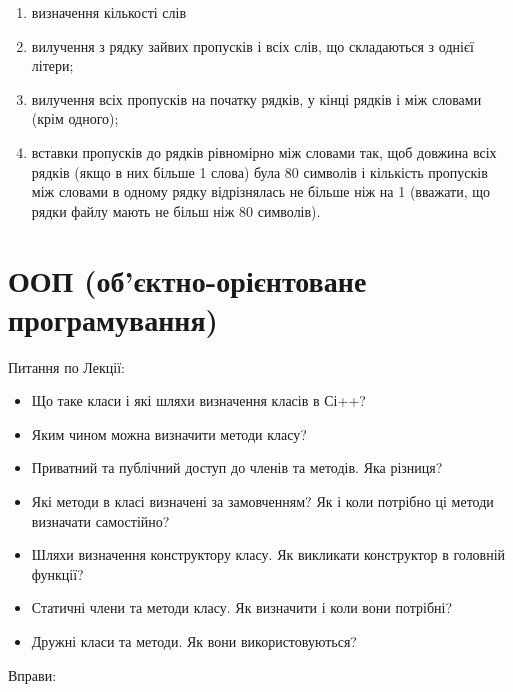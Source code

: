\documentclass[]{article}
\makeatletter
\newcommand{\xslalph}[1]{\expandafter\@xslalph\csname c@#1\endcsname}
\newcommand{\@xslalph}[1]{%
    \ifcase#1\or а\or б\or в\or г\or д\or e\or є\or ж\or з\or i%
    \or й\or к\or л\or м\or н\or о\or п\or р\or с\or т%
    \or у\or ф\or х\or ц\or ч\or ш\or ю\or я\or аа\or бб\or вв %
    \else\@ctrerr\fi%
}
\makeatother
\begin{document}
\begin{enumerate}
\begin{enumerate}[label=\xslalph*)]
\item визначення кількості слів
\item вилучення з рядку зайвих пропусків і всіх слів, що складаються з
однієї літери;
\item вилучення всіх пропусків на початку рядків, у кінці рядків і між
словами (крім одного);
\item вставки пропусків до рядків рівномірно між словами так, щоб довжина
всіх рядків (якщо в них більше 1 слова) була 80 символів і 
кількість пропусків між словами в одному рядку відрізнялась не більше ніж на 1 
(вважати, що рядки файлу мають не більш ніж 80 символів).

\end{enumerate}

\end{enumerate}


\section { ООП (об'єктно-орієнтоване програмування)}


Питання по Лекції:
\begin{itemize}
\item
Що таке класи і які шляхи визначення класів в Сі++?
\item
Яким чином можна визначити методи класу?
\item
Приватний та публічний доступ до членів та методів. Яка різниця?
\item
Які методи в класі визначені за замовченням? Як і коли потрібно ці
методи визначати самостійно?
\item
Шляхи визначення конструктору класу. Як викликати конструктор в головній
функції?
\item
Статичні члени та методи класу. Як визначити і коли вони потрібні?
\item
Дружні класи та методи. Як вони використовуються?
\end{itemize}

Вправи:
\end{document}

